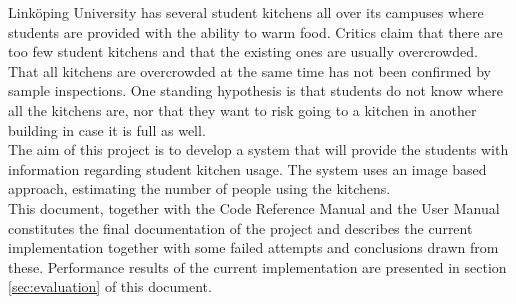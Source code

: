 Linköping University has several student kitchens all over its campuses where students are provided with the ability to warm food. Critics claim that there are too few student kitchens and that the existing ones are usually overcrowded. That all kitchens are overcrowded at the same time has not been confirmed by sample inspections. One standing hypothesis is that students do not know where all the kitchens are, nor that they want to risk going to a kitchen in another building in case it is full as well.\\

The aim of this project is to develop a system that will provide the students with information regarding student kitchen usage. The system uses an image based approach, estimating the number of people using the kitchens.\\

This document, together with the Code Reference Manual and the User Manual constitutes the final documentation of the project and describes the current implementation together with some failed attempts and conclusions drawn from these. Performance results of the current implementation are presented in section \ref{sec:evaluation} of this document.
